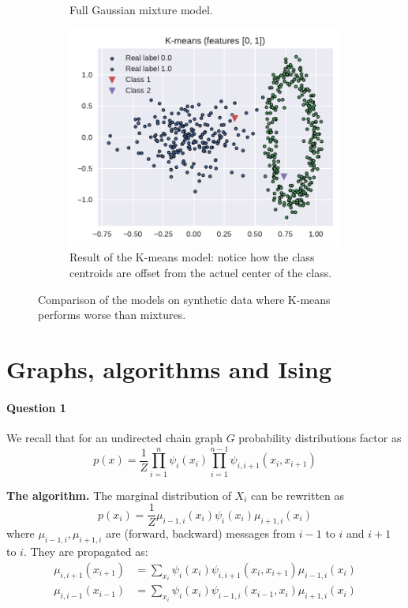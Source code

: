\documentclass[11pt]{article}
\begin{document}
\begin{figure}
\begin{subfigure}[t]{.5\linewidth}
	\caption{Full Gaussian mixture model.}
	\end{subfigure}
	\begin{subfigure}[t]{.6\linewidth}
	\includegraphics[width=\linewidth]{custom_data/kmeans_K2.pdf}
	\caption{Result of the K-means model: notice how the class centroids are offset from the actuel center of the class.}
	\end{subfigure}
	\caption{Comparison of the models on synthetic data where K-means performs worse than mixtures.}
	\label{fig:SynthDataComparison}
\end{figure}



\clearpage


\section{Graphs, algorithms and Ising}

\paragraph{Question 1} We recall that for an undirected chain graph $G$ probability distributions factor as
\begin{equation}
	p(x) = \frac{1}{Z}
	\prod_{i=1}^n \psi_i(x_i) 
	\prod_{i=1}^{n-1} \psi_{i,i+1}(x_i, x_{i+1})
\end{equation}

\newcommand{\LogSumExp}{\mathrm{LogSumExp}}

\textbf{The algorithm.} The marginal distribution of $X_i$ can be rewritten as
\[
	p(x_i) = \frac{1}{Z}\mu_{i-1, i}(x_i) \psi_i(x_i) \mu_{i+1, i}(x_i)
\]
where $\mu_{i-1, i}, \mu_{i+1, i}$ are (forward, backward) messages from $i-1$ to $i$ and $i+1$ to $i$. They are propagated as:
\begin{subequations}
\begin{align}
	\mu_{i, i+1}(x_{i+1}) &= \sum_{x_i}
	\psi_i(x_i)\psi_{i,i+1}(x_i, x_{i+1})
	\mu_{i-1, i}(x_i)  \\
	\mu_{i, i-1}(x_{i-1}) &= \sum_{x_i} \psi_{i}(x_i) \psi_{i-1,i}(x_{i-1}, x_i) \mu_{i+1, i}(x_i)
\end{align}
\end{subequations}
\end{document}
